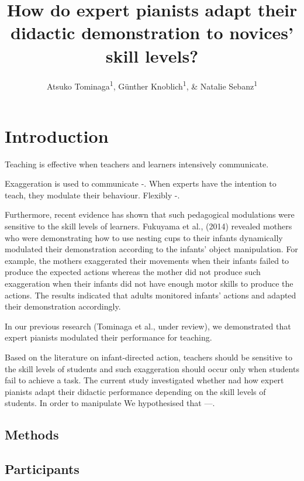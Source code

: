 \documentclass[
  man]{apa6}
\title{How do expert pianists adapt their didactic demonstration to novices' skill levels?}
\author{Atsuko Tominaga\textsuperscript{1}, Günther Knoblich\textsuperscript{1}, \& Natalie Sebanz\textsuperscript{1}}
\date{}
\affiliation{\vspace{0.5cm}\textsuperscript{1} Department of Cognitive Science, Central European University}
\begin{document}
\maketitle

\hypertarget{introduction}{%
\section{Introduction}\label{introduction}}

Teaching is effective when teachers and learners intensively communicate.

Exaggeration is used to communicate -. When experts have the intention to teach, they modulate their behaviour. Flexibly -.

Furthermore, recent evidence has shown that such pedagogical modulations were sensitive to the skill levels of learners. Fukuyama et al., (2014) revealed mothers who were demonstrating how to use nesting cups to their infants dynamically modulated their demonstration according to the infants' object manipulation. For example, the mothers exaggerated their movements when their infants failed to produce the expected actions whereas the mother did not produce such exaggeration when their infants did not have enough motor skills to produce the actions. The results indicated that adults monitored infants' actions and adapted their demonstration accordingly.

In our previous research (Tominaga et al., under review), we demonstrated that expert pianists modulated their performance for teaching.

Based on the literature on infant-directed action, teachers should be sensitive to the skill levels of students and such exaggeration should occur only when students fail to achieve a task. The current study investigated whether nad how expert pianists adapt their didactic performance depending on the skill levels of students. In order to manipulate
We hypothesised that ---.

\hypertarget{methods}{%
\subsection{Methods}\label{methods}}

\hypertarget{participants}{%
\subsection{Participants}\label{participants}}
\end{document}
